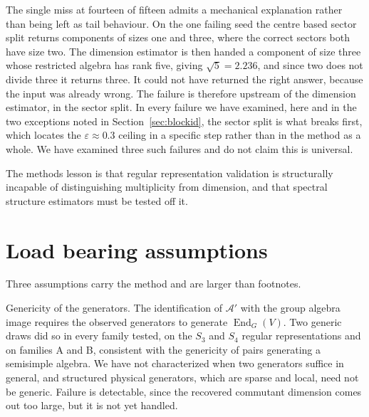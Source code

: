 \documentclass[11pt]{article}
\newcommand{\End}{\operatorname{End}}
\begin{document}
The single miss at fourteen of fifteen admits a mechanical explanation rather
than being left as tail behaviour. On the one failing seed the centre based
sector split returns components of sizes one and three, where the correct sectors
both have size two. The dimension estimator is then handed a component of size
three whose restricted algebra has rank five, giving $\sqrt5=2.236$, and since
two does not divide three it returns three. It could not have returned the right
answer, because the input was already wrong. The failure is therefore upstream of
the dimension estimator, in the sector split. In every failure we have examined,
here and in the two exceptions noted in Section~\ref{sec:blockid}, the sector
split is what breaks first, which locates the $\varepsilon\approx0.3$ ceiling in
a specific step rather than in the method as a whole. We have examined three such
failures and do not claim this is universal.

The methods lesson is that regular representation validation is structurally
incapable of distinguishing multiplicity from dimension, and that spectral
structure estimators must be tested off it.

\section{Load bearing assumptions}\label{sec:assumptions}
Three assumptions carry the method and are larger than footnotes.

Genericity of the generators. The identification of $\mathcal{A}'$ with the group
algebra image requires the observed generators to generate $\End_G(V)$. Two
generic draws did so in every family tested, on the $S_3$ and $S_4$ regular
representations and on families A and B, consistent with the genericity of pairs
generating a semisimple algebra. We have not characterized when two generators
suffice in general, and structured physical generators, which are sparse and
local, need not be generic. Failure is detectable, since the recovered commutant
dimension comes out too large, but it is not yet handled.
\end{document}
